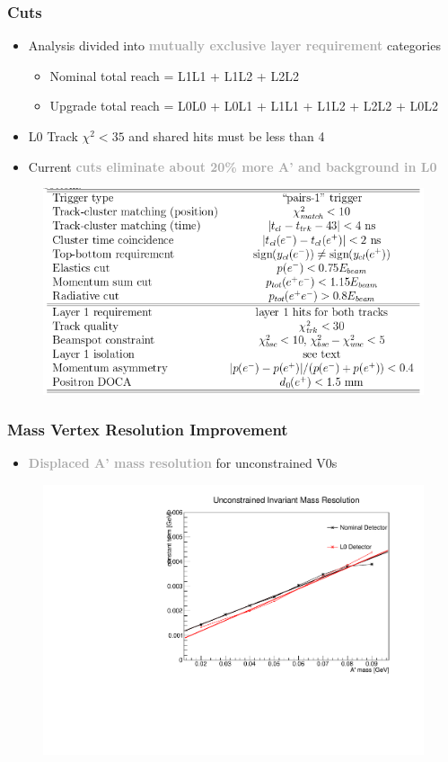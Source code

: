 \documentclass{beamer}
\begin{document}

\begin{frame}
\frametitle{Cuts}
\begin{itemize}
\item Analysis divided into \textcolor{darkgray}{\textbf{mutually exclusive layer requirement}} categories
\begin{itemize}
\item Nominal total reach = L1L1 + L1L2 + L2L2
\item Upgrade total reach = L0L0 + L0L1 + L1L1 + L1L2 + L2L2 + L0L2
\end{itemize}
\item L0 Track $\chi^2<35$ and shared hits must be less than 4
\item Current \textcolor{darkgray}{\textbf{cuts eliminate about 20\% more A' and background in L0}}
\end{itemize}
\begin{figure}
\includegraphics[width=0.6\linewidth]{figs/cuts.png}
\end{figure}

\end{frame}


\begin{frame}
\frametitle{Mass Vertex Resolution Improvement} %
\begin{itemize}
\item \textcolor{darkgray}{\textbf{Displaced A' mass resolution}} for unconstrained V0s %
\end{itemize}
\begin{figure}
\includegraphics[width=0.55\linewidth]{figs/mass_res.pdf}
\end{figure}

\end{frame}
\end{document}
